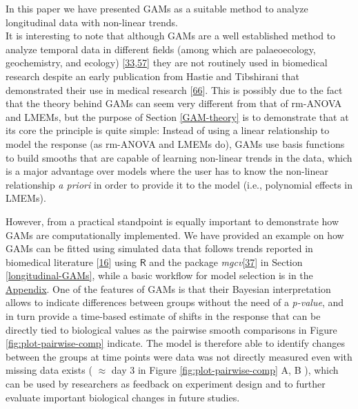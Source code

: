 \documentclass[
]{article}
\begin{document}
In this paper we have presented GAMs as a suitable method to analyze longitudinal data with non-linear trends.\\
It is interesting to note that although GAMs are a well established method to analyze temporal data in different fields (among which are palaeoecology, geochemistry, and ecology) {[}\protect\hyperlink{ref-pedersen2019}{33},\protect\hyperlink{ref-hefley2017}{57}{]} they are not routinely used in biomedical research despite an early publication from Hastie and Tibshirani that demonstrated their use in medical research {[}\protect\hyperlink{ref-hastie1995}{66}{]}. This is possibly due to the fact that the theory behind GAMs can seem very different from that of rm-ANOVA and LMEMs, but the purpose of Section \ref{GAM-theory} is to demonstrate that at its core the principle is quite simple: Instead of using a linear relationship to model the response (as rm-ANOVA and LMEMs do), GAMs use basis functions to build smooths that are capable of learning non-linear trends in the data, which is a major advantage over models where the user has to know the non-linear relationship \emph{a priori} in order to provide it to the model (i.e., polynomial effects in LMEMs).

However, from a practical standpoint is equally important to demonstrate how GAMs are computationally implemented. We have provided an example on how GAMs can be fitted using simulated data that follows trends reported in biomedical literature {[}\protect\hyperlink{ref-vishwanath2009}{16}{]} using \(\textsf{R}\) and the package \emph{mgcv}{[}\protect\hyperlink{ref-wood2017}{37}{]} in Section \ref{longitudinal-GAMs}, while a basic workflow for model selection is in the \protect\hyperlink{workflow}{Appendix}. One of the features of GAMs is that their Bayesian interpretation allows to indicate differences between groups without the need of a \emph{p-value}, and in turn provide a time-based estimate of shifts in the response that can be directly tied to biological values as the pairwise smooth comparisons in Figure \ref{fig:plot-pairwise-comp} indicate. The model is therefore able to identify changes between the groups at time points were data was not directly measured even with missing data exists ( \(\approx\) day 3 in Figure \ref{fig:plot-pairwise-comp} A, B ), which can be used by researchers as feedback on experiment design and to further evaluate important biological changes in future studies.
\end{document}
